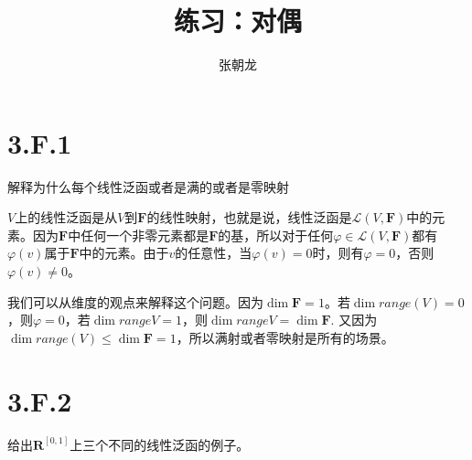 \documentclass[10pt,a4paper,UTF8]{article}
\author{张朝龙}
\date{}
\title{练习：对偶}
\begin{document}
\maketitle
\tableofcontents
{}

\section{3.F.1}
\label{sec:orgdd9d429}


\begin{problem}
解释为什么每个线性泛函或者是满的或者是零映射
\end{problem}

\begin{answer}
\(V\)上的线性泛函是从\(V\)到\(\mathbf{F}\)的线性映射，也就是说，线性泛函是\(\mathcal{L}(V, \mathbf{F})\)中的元素。因为\(\mathbf{F}\)中任何一个非零元素都是\(\mathbf{F}\)的基，所以对于任何\(\varphi\in \mathcal{L}(V, \mathbf{F})\)都有\(\varphi(v)\)属于\(\mathbf{F}\)中的元素。由于\(v\)的任意性，当\(\varphi(v) = 0\)时，则有\(\varphi = 0\)，否则\(\varphi(v)\neq 0\)。

我们可以从维度的观点来解释这个问题。因为\(\dim \mathbf{F} = 1\)。若\(\dim range(V) = 0\)，则\(\varphi = 0\)，若\(\dim rangeV = 1\)，则\(\dim range V = \dim \mathbf{F}\). 又因为\(\dim range(V) \leq \dim \mathbf{F} = 1\)，所以满射或者零映射是所有的场景。
\end{answer}

\section{3.F.2}
\label{sec:org59e37eb}


\begin{problem}
给出\(\mathbf{R}^{[0,1]}\)上三个不同的线性泛函的例子。
\end{problem}
\end{document}
